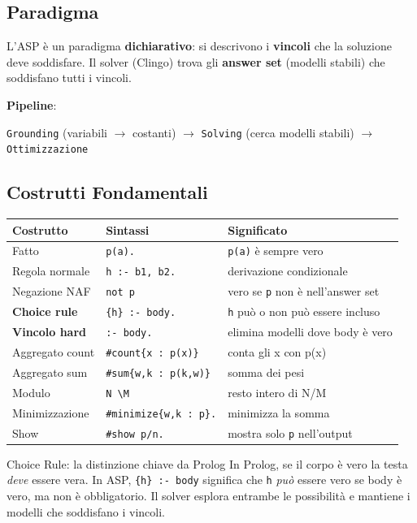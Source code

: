 \documentclass[12pt,a4paper]{article}
\begin{document}
\subsection{Paradigma}

L'ASP è un paradigma \textbf{dichiarativo}: si descrivono i \textbf{vincoli} che
la soluzione deve soddisfare. Il solver (Clingo) trova gli \textbf{answer set}
(modelli stabili) che soddisfano tutti i vincoli.

\textbf{Pipeline}:
\begin{center}
\texttt{Grounding} (variabili $\to$ costanti) $\longrightarrow$ \texttt{Solving} (cerca modelli stabili) $\longrightarrow$ \texttt{Ottimizzazione}
\end{center}

\subsection{Costrutti Fondamentali}

\begin{center}
\renewcommand{\arraystretch}{1.4}
\begin{tabular}{p{3.2cm}p{4.2cm}p{6cm}}
\toprule
\textbf{Costrutto} & \textbf{Sintassi} & \textbf{Significato} \\
\midrule
Fatto & \texttt{p(a).} & \texttt{p(a)} è sempre vero \\
Regola normale & \texttt{h :- b1, b2.} & derivazione condizionale \\
Negazione NAF & \texttt{not p} & vero se \texttt{p} non è nell'answer set \\
\textbf{Choice rule} & \texttt{\{h\} :- body.} & \texttt{h} può o non può essere incluso \\
\textbf{Vincolo hard} & \texttt{:- body.} & elimina modelli dove body è vero \\
Aggregato count & \texttt{\#count\{x : p(x)\}} & conta gli x con p(x) \\
Aggregato sum & \texttt{\#sum\{w,k : p(k,w)\}} & somma dei pesi \\
Modulo & \texttt{N \textbackslash M} & resto intero di N/M \\
Minimizzazione & \texttt{\#minimize\{w,k : p\}.} & minimizza la somma \\
Show & \texttt{\#show p/n.} & mostra solo \texttt{p} nell'output \\
\bottomrule
\end{tabular}
\end{center}

\begin{defbox}{Choice Rule: la distinzione chiave da Prolog}
In Prolog, se il corpo è vero la testa \emph{deve} essere vera.
In ASP, \texttt{\{h\} :- body} significa che \texttt{h} \emph{può} essere
vero se body è vero, ma non è obbligatorio. Il solver esplora entrambe le
possibilità e mantiene i modelli che soddisfano i vincoli.
\end{defbox}
\end{document}
